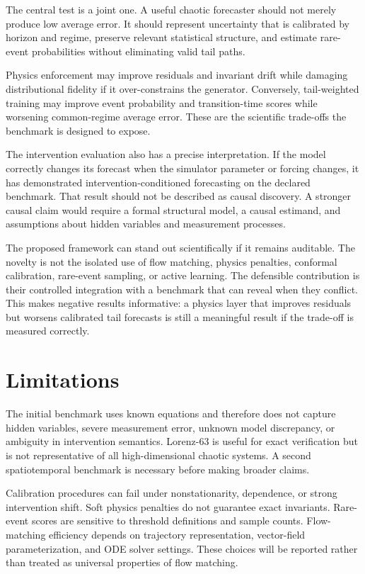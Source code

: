 \documentclass[11pt]{article}
\begin{document}
The central test is a joint one. A useful chaotic forecaster should not merely produce low average error. It should represent uncertainty that is calibrated by horizon and regime, preserve relevant statistical structure, and estimate rare-event probabilities without eliminating valid tail paths.

Physics enforcement may improve residuals and invariant drift while damaging distributional fidelity if it over-constrains the generator. Conversely, tail-weighted training may improve event probability and transition-time scores while worsening common-regime average error. These are the scientific trade-offs the benchmark is designed to expose.

The intervention evaluation also has a precise interpretation. If the model correctly changes its forecast when the simulator parameter or forcing changes, it has demonstrated intervention-conditioned forecasting on the declared benchmark. That result should not be described as causal discovery. A stronger causal claim would require a formal structural model, a causal estimand, and assumptions about hidden variables and measurement processes.

The proposed framework can stand out scientifically if it remains auditable. The novelty is not the isolated use of flow matching, physics penalties, conformal calibration, rare-event sampling, or active learning. The defensible contribution is their controlled integration with a benchmark that can reveal when they conflict. This makes negative results informative: a physics layer that improves residuals but worsens calibrated tail forecasts is still a meaningful result if the trade-off is measured correctly.

\section{Limitations}

The initial benchmark uses known equations and therefore does not capture hidden variables, severe measurement error, unknown model discrepancy, or ambiguity in intervention semantics. Lorenz-63 is useful for exact verification but is not representative of all high-dimensional chaotic systems. A second spatiotemporal benchmark is necessary before making broader claims.

Calibration procedures can fail under nonstationarity, dependence, or strong intervention shift. Soft physics penalties do not guarantee exact invariants. Rare-event scores are sensitive to threshold definitions and sample counts. Flow-matching efficiency depends on trajectory representation, vector-field parameterization, and ODE solver settings. These choices will be reported rather than treated as universal properties of flow matching.
\end{document}
